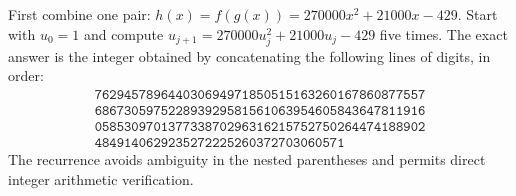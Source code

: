 First combine one pair: $h(x)=f(g(x))=270000x^2+21000x-429$. Start with $u_0=1$ and compute $u_{j+1}=270000u_j^2+21000u_j-429$ five times. The exact answer is the integer obtained by concatenating the following lines of digits, in order: \[\begin{gathered}\texttt{762945789644030694971850515163260167860877557}\\\texttt{686730597522893929581561063954605843647811916}\\\texttt{058530970137733870296316215752750264474188902}\\\texttt{4849140629235272225260372703060571}\end{gathered}\]The recurrence avoids ambiguity in the nested parentheses and permits direct integer arithmetic verification.

